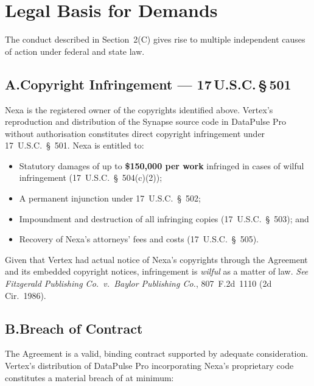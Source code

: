 
\section{Legal Basis for Demands}

The conduct described in Section~2(C) gives rise to multiple independent causes
of action under federal and state law.

\subsection*{A.\quad Copyright Infringement — 17\,U.S.C.\,\S\,501}

Nexa is the registered owner of the copyrights identified above. Vertex's
reproduction and distribution of the Synapse source code in DataPulse Pro
without authorisation constitutes direct copyright infringement under
17~U.S.C.~\S~501. Nexa is entitled to:

\begin{itemize}[leftmargin=2em, itemsep=4pt]
  \item Statutory damages of up to \textbf{\$150,000 per work} infringed in
        cases of wilful infringement (17~U.S.C.~\S~504(c)(2));
  \item A permanent injunction under 17~U.S.C.~\S~502;
  \item Impoundment and destruction of all infringing copies
        (17~U.S.C.~\S~503); and
  \item Recovery of Nexa's attorneys' fees and costs (17~U.S.C.~\S~505).
\end{itemize}

Given that Vertex had actual notice of Nexa's copyrights through the Agreement
and its embedded copyright notices, infringement is \textit{wilful} as a
matter of law. \textit{See Fitzgerald Publishing Co.\ v.\ Baylor Publishing
Co.}, 807~F.2d~1110 (2d Cir.\ 1986).

\subsection*{B.\quad Breach of Contract}

The Agreement is a valid, binding contract supported by adequate consideration.
Vertex's distribution of DataPulse Pro incorporating Nexa's proprietary code
constitutes a material breach of at minimum:

